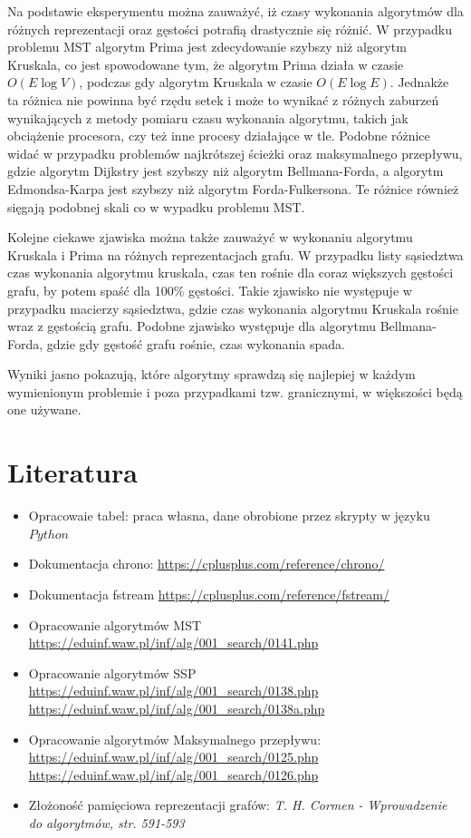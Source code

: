 \documentclass{article}
\begin{document}
Na podstawie eksperymentu można zauważyć, iż czasy wykonania algorytmów dla różnych reprezentacji oraz gęstości potrafią drastycznie się różnić.
W przypadku problemu MST algorytm Prima jest zdecydowanie szybszy niż algorytm Kruskala, co jest spowodowane tym, że algorytm Prima działa w czasie $O(E \log V)$, podczas gdy algorytm Kruskala w czasie $O(E \log E)$.
Jednakże ta różnica nie powinna być rzędu setek i może to wynikać z różnych zaburzeń wynikających z metody pomiaru czasu wykonania algorytmu, takich jak obciążenie procesora, czy też inne procesy działające w tle.
Podobne różnice widać w przypadku problemów najkrótszej ścieżki oraz maksymalnego przepływu, gdzie algorytm Dijkstry jest szybszy niż algorytm Bellmana-Forda, a algorytm Edmondsa-Karpa jest szybszy niż algorytm Forda-Fulkersona.
Te różnice również sięgają podobnej skali co w wypadku problemu MST. 

Kolejne ciekawe zjawiska można także zauważyć w wykonaniu algorytmu Kruskala i Prima na różnych reprezentacjach grafu.
W przypadku listy sąsiedztwa czas wykonania algorytmu kruskala, czas ten rośnie dla coraz większych gęstości grafu, by potem spaść dla 100\% gęstości.
Takie zjawisko nie występuje w przypadku macierzy sąsiedztwa, gdzie czas wykonania algorytmu Kruskala rośnie wraz z gęstością grafu. Podobne zjawisko występuje dla algorytmu
Bellmana-Forda, gdzie gdy gęstość grafu rośnie, czas wykonania spada.

Wyniki jasno pokazują, które algorytmy sprawdzą się najlepiej w każdym wymienionym problemie i poza przypadkami tzw. granicznymi, w większości będą one używane.
\section{Literatura}
\begin{itemize}
    \item Opracowaie tabel: praca własna, dane obrobione przez skrypty w języku $Python$
    \item Dokumentacja chrono: \url{https://cplusplus.com/reference/chrono/}
    \item Dokumentacja fstream \url{https://cplusplus.com/reference/fstream/}
    \item Opracowanie algorytmów MST \url{https://eduinf.waw.pl/inf/alg/001_search/0141.php}
    \item Opracowanie algorytmów SSP \\ \url{https://eduinf.waw.pl/inf/alg/001_search/0138.php} \\ \url{https://eduinf.waw.pl/inf/alg/001_search/0138a.php}
    \item Opracowanie algorytmów Maksymalnego przepływu: \\ \url{https://eduinf.waw.pl/inf/alg/001_search/0125.php} \\ \url{https://eduinf.waw.pl/inf/alg/001_search/0126.php}
    \item Złożoność pamięciowa reprezentacji grafów: \textit{T. H. Cormen - Wprowadzenie do algorytmów, str. 591-593}
\end{itemize}
\end{document}
